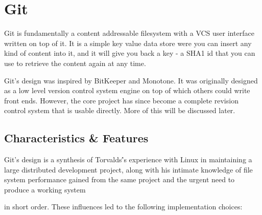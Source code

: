 \section{Git}

Git is fundamentally a content addressable filesystem with a VCS user interface
written on top of it. It is a simple key value data store were you can insert
any kind of content into it, and it will give you back a key - a SHA1 id that
you can use to retrieve the content again at any time.

Git’s design was inspired\cite{inspiration} by BitKeeper and Monotone. It was
originally designed as a low level version control system engine on top of which
others could write front ends. However, the core project has since become a
complete revision control system that is usable directly. More of this will be
discussed later.

\subsection{Characteristics \& Features}

Git\’'s design is a synthesis of Torvalds\'’s experience with Linux in
maintaining a large distributed development project, along with his intimate
knowledge of file system performance gained from the same project and the urgent
need to produce a working system

in short order. These influences led to the following implementation choices:

